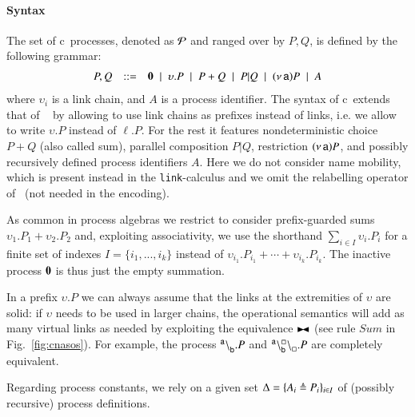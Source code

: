 \paragraph{Syntax}
The set of c\CNA\ processes, denoted as $\cal{P}$ and ranged over by $P,Q$, is defined by the following grammar:
\[
\begin{array}{rcl}
P,Q & ::= &
\mathbf{0} \;\mid\;
\upsilon.P  \;\mid\;
P+Q \;\mid\;
P|Q \;\mid\;
(\nu\, \mathsf{a}) P \;\mid\;
A
\end{array}
\]
\noindent
where $\upsilon_i$ is a  link chain,
and $A$ is a process identifier.
The syntax of c\CNA\  extends that of \CNA~\cite{BBB17} by allowing to use link chains as prefixes instead of links, i.e. we allow to write $\upsilon.P$ instead of $\ell.P$.
For the rest it features nondeterministic choice $P+Q$ (also called sum), parallel composition $P|Q$, restriction $(\nu\, \mathsf{a}) P$, and possibly recursively defined process identifiers $A$. 
Here we do not consider name mobility, which is present instead in the {\tt link}-calculus and we omit the relabelling operator of \CNA\ (not needed in the encoding).

As common in process algebras we restrict to consider prefix-guarded sums $\upsilon_1.P_1 + \upsilon_2.P_2$ and, exploiting associativity, we use the shorthand $\sum_{i\in I} \upsilon_i.P_i$ for a finite set of indexes $I=\{i_1,...,i_k\}$ instead of $\upsilon_{i_1}.P_{i_1} + \cdots + \upsilon_{i_k}.P_{i_k}$.
The inactive process $\mathbf{0}$ is thus just the empty summation.

In a prefix $\upsilon.P$ we can always assume that the links at the extremities of $\upsilon$ are solid: if $\upsilon$ needs to be used in larger chains, the operational semantics will add as many virtual links as needed by exploiting the equivalence $\blackstretcheq$ (see rule $\mathit{Sum}$ in Fig.~\ref{fig:cnasos}). For example, the process ${}^{\mathsf{a}} \backslash_{\mathsf{b}}^{}.P$ and ${}^{\mathsf{a}}_{}\backslash_{\mathsf{b}}^{\scriptstyle {\square}}\backslash_{\scriptstyle {\square}}^{}.P$
 are completely equivalent.
 
Regarding process constants,  we rely on a given set $\Delta=\{A_i\triangleq P_i\}_{i\in I}$ of (possibly
recursive) process definitions.



